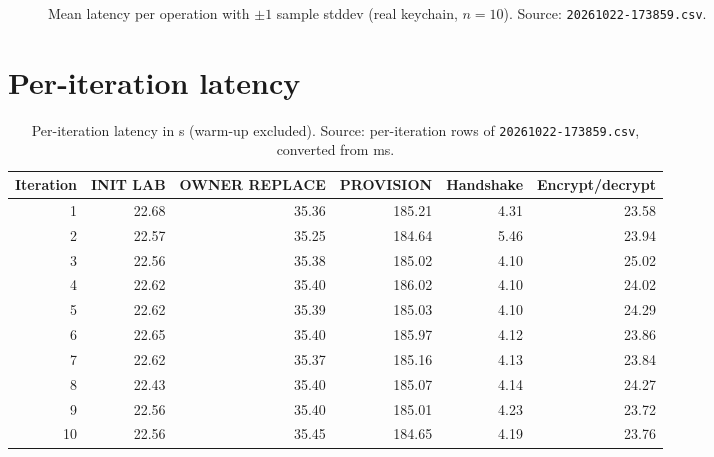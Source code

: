 \documentclass[11pt,a4paper]{report}
\begin{document}
\begin{figure}[htbp]
\centering
{}
\caption{Mean latency per operation with $\pm 1$ sample stddev (real keychain, $n = 10$). Source: \texttt{20261022-173859.csv}.}
\label{fig:means}
\end{figure}

\section{Per-iteration latency}

\begin{table}[htbp]
\centering\small
\begin{tabular}{rrrrrr}
\toprule
Iteration & INIT LAB & OWNER REPLACE & PROVISION & Handshake & Encrypt/decrypt \\
\midrule
1  & 22.68 & 35.36 & 185.21 & 4.31 & 23.58 \\
2  & 22.57 & 35.25 & 184.64 & 5.46 & 23.94 \\
3  & 22.56 & 35.38 & 185.02 & 4.10 & 25.02 \\
4  & 22.62 & 35.40 & 186.02 & 4.10 & 24.02 \\
5  & 22.62 & 35.39 & 185.03 & 4.10 & 24.29 \\
6  & 22.65 & 35.40 & 185.97 & 4.12 & 23.86 \\
7  & 22.62 & 35.37 & 185.16 & 4.13 & 23.84 \\
8  & 22.43 & 35.40 & 185.07 & 4.14 & 24.27 \\
9  & 22.56 & 35.40 & 185.01 & 4.23 & 23.72 \\
10 & 22.56 & 35.45 & 184.65 & 4.19 & 23.76 \\
\bottomrule
\end{tabular}
\caption{Per-iteration latency in s (warm-up excluded). Source: per-iteration rows of \texttt{20261022-173859.csv}, converted from ms.}
\label{tab:iter}
\end{table}
\end{document}
